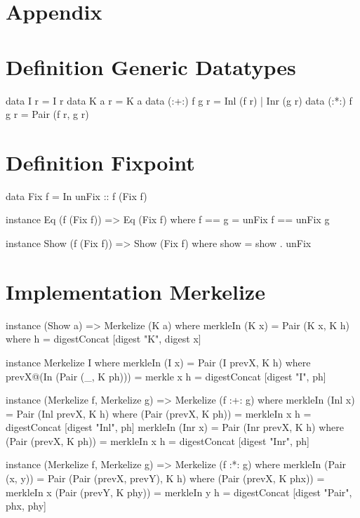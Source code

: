 \section{Appendix}
\appendix

\label{app-def-generic-datatypes}
\section{Definition Generic Datatypes}
\begin{haskell}
data I r         = I r                  
data K a r       = K a                  
data (:+:) f g r = Inl (f r) | Inr (g r)
data (:*:) f g r = Pair (f r, g r)      
\end{haskell}

\label{app-def-fixpoint}
\section{Definition Fixpoint}
\begin{haskell}
data Fix f = In { unFix :: f (Fix f) }

instance Eq (f (Fix f)) => Eq (Fix f) where
    f == g = unFix f == unFix g

instance Show (f (Fix f)) => Show (Fix f) where
    show = show . unFix
\end{haskell}

\label{app-impl-merkelize}
\section{Implementation Merkelize}
\begin{haskell}
instance (Show a) => Merkelize (K a) where
  merkleIn (K x) = Pair (K x, K h)
    where
      h = digestConcat [digest "K", digest x]

instance Merkelize I where
  merkleIn (I x) = Pair (I prevX, K h)
    where
      prevX@(In (Pair (_, K ph))) = merkle x
      h = digestConcat [digest "I", ph]

instance (Merkelize f, Merkelize g) => Merkelize (f :+: g) where
  merkleIn (Inl x) = Pair (Inl prevX, K h)
    where
      (Pair (prevX, K ph)) = merkleIn x
      h = digestConcat [digest "Inl", ph]
  merkleIn (Inr x) = Pair (Inr prevX, K h)
    where
      (Pair (prevX, K ph)) = merkleIn x
      h = digestConcat [digest "Inr", ph]

instance (Merkelize f, Merkelize g) => Merkelize (f :*: g) where
  merkleIn (Pair (x, y)) = Pair (Pair (prevX, prevY), K h)
    where
      (Pair (prevX, K phx)) = merkleIn x
      (Pair (prevY, K phy)) = merkleIn y
      h = digestConcat [digest "Pair", phx, phy]
\end{haskell}

